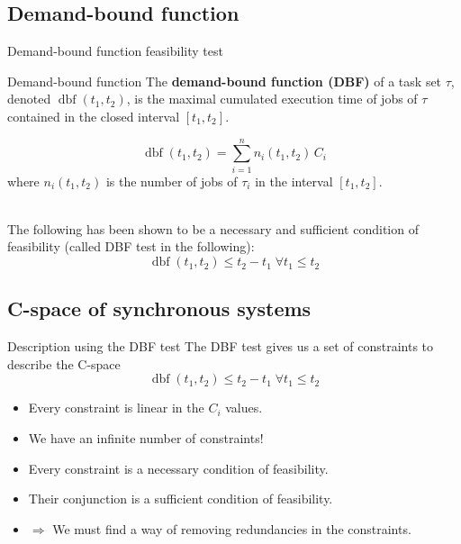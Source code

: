 \documentclass{beamer}
\newcommand{\dbf}[1]{\operatorname{dbf}(#1)}
\begin{document}
    \begin{frame}
    \end{frame}

    \subsection{Demand-bound function}

    \begin{frame}{Demand-bound function feasibility test}
        \begin{block}{Demand-bound function}
            The \textbf{demand-bound function (DBF)} \cite{baruah1999generalized,
        baruah1990algorithms}
            of a task set $\tau$, denoted $\dbf{t_1, t_2}$, is
            the maximal cumulated execution time of jobs of $\tau$ contained in the
            closed interval $[t_1, t_2]$.
        \end{block}
        $$\dbf{t_1, t_2} = \sum_{i=1}^{n} n_i(t_1, t_2) \, C_i$$
        where $n_i(t_1, t_2)$ is the number of jobs of $\tau_i$ in the interval $[t_1, t_2]$.

        ~\\

        The following has been shown to be a necessary and sufficient condition of feasibility (called DBF test in the following): $$\dbf{t_1, t_2} \leqslant t_2 - t_1 \; \forall t_1 \leq t_2$$

    \end{frame}

    \subsection{C-space of synchronous systems}

    \begin{frame}{Description using the DBF test}
    The DBF test gives us a set of constraints to describe the C-space
    $$\dbf{t_1, t_2} \leqslant t_2 - t_1 \; \forall t_1 \leq t_2$$

    \begin{itemize}
        \item Every constraint is linear in the $C_i$ values.
        \item We have an infinite number of constraints!
        \item Every constraint is a necessary condition of feasibility.
        \item Their conjunction is a sufficient condition of feasibility.
        \item $\Rightarrow$ We must find a way of removing redundancies in the constraints.
    \end{itemize}
    \end{frame}
\end{document}
